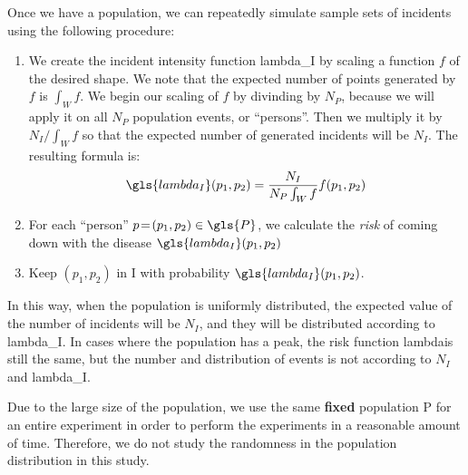 Once we have a population,
we can repeatedly simulate sample sets of incidents using the following procedure:
\begin{enumerate}
    \item We create the incident intensity function \gls{lambda_I}
        by scaling a function $f$ of the desired shape.
        We note that the expected number of points generated by $f$ is $\int_{W} f$.
        We begin our scaling of $f$ by divinding by $N_P$,
        because we will apply it on all $N_P$ population \glspl{event}, or ``persons''.
        Then we multiply it by $N_I/\int_{W} f$
        so that the expected number of generated \glspl{incident} will be $N_I$.
        The resulting formula is:
        $$
            \gls{lambda_I}(p_1, p_2) = \frac{N_I}{N_P \int_{W} f} f(p_1, p_2)
        $$
    \item For each ``person'' $p\!=\!(p_1, p_2) \in \gls{P}$,
        we calculate the \textit{risk} of coming down with the disease $\gls{lambda_I}(p_1, p_2)$
    \item Keep $(p_1, p_2)$ in \gls{I} with probability $\gls{lambda_I}(p_1, p_2)$.
\end{enumerate}

In this way,
when the population is uniformly distributed,
the expected value of the number of \glspl{incident} will be $N_I$,
and they will be distributed according to \gls{lambda_I}.
In cases where the population has a peak,
the risk function \gls{lambda}\dotdot is still the same,
but the number and distribution of events is not according to $N_I$ and \gls{lambda_I}.

Due to the large size of the population,
we use the same \textbf{fixed} population \gls{P} for an entire experiment
in order to perform the experiments in a reasonable amount of time.
Therefore,
we do not study the randomness in the population distribution in this study.